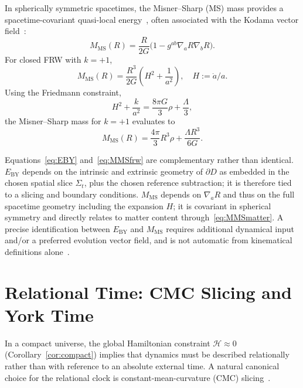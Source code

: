 \documentclass[12pt,a4paper]{article}
\newcommand{\Sig}{\Sigma}           %
\newcommand{\pa}{\partial}          %
\newcommand{\EBY}{E_{\mathrm{BY}}}
\newcommand{\MMS}{M_{\mathrm{MS}}}
\newcommand{\onshell}{\approx}
\begin{document}
In spherically symmetric spacetimes, the Misner--Sharp
(MS) mass provides a spacetime-covariant quasi-local
energy~\cite{MisnerSharp1964}, often associated with the
Kodama vector field~\cite{Kodama1980,Hayward1996}:
\begin{equation}
  \MMS(R) = \frac{R}{2G}\bigl(1 - g^{ab}\nabla_a R\nabla_b R\bigr).
  \label{eq:MMS}
\end{equation}
For closed FRW with $k = +1$,
\begin{equation}
  \MMS(R) = \frac{R^3}{2G}\!\left(H^2 + \frac{1}{a^2}\right),
  \quad H := \dot{a}/a.
  \label{eq:MMSfrw}
\end{equation}
Using the Friedmann constraint,
\begin{equation}
  H^2 + \frac{k}{a^2} = \frac{8\pi G}{3}\rho + \frac{\Lambda}{3},
  \label{eq:Friedmann}
\end{equation}
the Misner--Sharp mass for $k=+1$ evaluates to
\begin{equation}
  \MMS(R) = \frac{4\pi}{3}R^3\rho + \frac{\Lambda R^3}{6G}.
  \label{eq:MMSmatter}
\end{equation}

Equations~\eqref{eq:EBY} and~\eqref{eq:MMSfrw} are
complementary rather than identical. $\EBY$ depends on
the intrinsic and extrinsic geometry of $\pa D$ as embedded
in the chosen spatial slice $\Sig_t$, plus the chosen
reference subtraction; it is therefore tied to a slicing
and boundary conditions. $\MMS$ depends on $\nabla_a R$
and thus on the full spacetime geometry including the
expansion $H$; it is covariant in spherical symmetry and
directly relates to matter content through~\eqref{eq:MMSmatter}.
A precise identification between $\EBY$ and $\MMS$ requires
additional dynamical input and/or a preferred evolution
vector field, and is not automatic from kinematical
definitions alone~\cite{Szabados2009}.

\section{Relational Time: CMC Slicing and York Time}
\label{sec:york}

In a compact universe, the global Hamiltonian constraint
$\mathcal{H}\onshell 0$ (Corollary~\ref{cor:compact})
implies that dynamics must be described relationally rather
than with reference to an absolute external time. A natural
canonical choice for the relational clock is
constant-mean-curvature (CMC) slicing~\cite{BrownKuchar1995,
Dittrich2006}.
\end{document}
